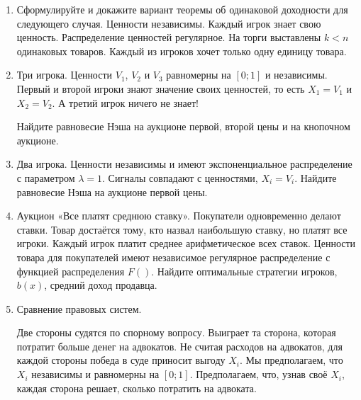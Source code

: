 \begin{enumerate}

\item Сформулируйте и докажите вариант теоремы об одинаковой доходности для следующего случая. Ценности независимы. Каждый игрок знает свою ценность. Распределение ценностей регулярное. На торги выставлены $ k<n $ одинаковых товаров. Каждый из игроков хочет только одну единицу товара.

\item Три игрока. Ценности $ V_{1} $, $ V_{2} $ и $ V_{3} $ равномерны на $ [0;1] $ и независимы. Первый и второй игроки знают значение своих ценностей, то есть $ X_{1}=V_{1} $ и $ X_{2}=V_{2} $. А третий игрок ничего не знает!

Найдите равновесие Нэша на аукционе первой, второй цены и на кнопочном аукционе.


\item Два игрока. Ценности независимы и имеют экспоненциальное распределение с параметром $ \lambda=1 $. Сигналы совпадают с ценностями,  $ X_{i}=V_{i} $. Найдите равновесие Нэша на аукционе первой цены. 




\item Аукцион «Все платят среднюю ставку». Покупатели одновременно делают ставки. Товар достаётся тому, кто назвал наибольшую ставку, но платят все игроки. Каждый игрок платит среднее арифметическое всех ставок. Ценности товара для покупателей имеют независимое регулярное распределение с функцией распределения $ F() $. Найдите оптимальные стратегии игроков, $ b(x) $, средний доход продавца.



\item Сравнение правовых систем.

Две стороны судятся по спорному вопросу. Выиграет та сторона, которая потратит больше денег на адвокатов. Не считая расходов на адвокатов, для каждой стороны победа в суде приносит выгоду $ X_{i} $. Мы предполагаем, что $ X_{i} $ независимы и равномерны на $ [0;1] $. Предполагаем, что, узнав своё $ X_{i} $, каждая сторона решает, сколько потратить на адвоката.


\end{enumerate}
